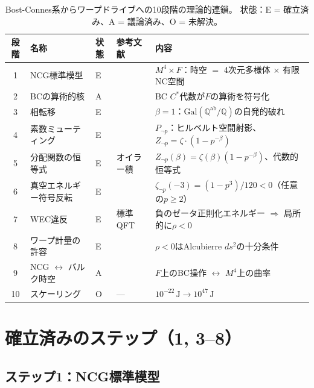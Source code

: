 \documentclass[11pt,a4paper]{article}
\newcommand{\Gal}{\mathrm{Gal}}
\begin{document}
\begin{table}[t]
\centering
\caption{Bost-Connes系からワープドライブへの10段階の理論的連鎖。
状態：E = 確立済み、A = 議論済み、O = 未解決。}
\label{tab:chain}
\begin{tabular}{@{}clllp{5.5cm}@{}}
\toprule
段階 & 名称 & 状態 & 参考文献 & 内容 \\
\midrule
1 & NCG標準模型 & E & \cite{Connes1996,CCM2007} & $M^4 \times F$：時空 $=$ 4次元多様体 $\times$ 有限NC空間 \\
2 & BCの算術的核 & A & \cite{ConnesMarcolli2006} & BC $C^*$代数が$F$の算術を符号化 \\
3 & 相転移 & E & \cite{BostConnes1995} & $\beta = 1$：$\Gal(\mathbb{Q}^{\mathrm{ab}}/\mathbb{Q})$の自発的破れ \\
4 & 素数ミューティング & E & \cite{paper_A} & $P_{\neg p}$：ヒルベルト空間射影、$Z_{\neg p} = \zeta \cdot (1-p^{-\beta})$ \\
5 & 分配関数の恒等式 & E & オイラー積 & $Z_{\neg p}(\beta) = \zeta(\beta)(1-p^{-\beta})$、代数的恒等式 \\
6 & 真空エネルギー符号反転 & E & \cite{paper_A} & $\zeta_{\neg p}(-3) = (1-p^3)/120 < 0$（任意の$p \geq 2$） \\
7 & WEC違反 & E & 標準QFT & 負のゼータ正則化エネルギー $\Rightarrow$ 局所的に$\rho < 0$ \\
8 & ワープ計量の許容 & E & \cite{Alcubierre1994} & $\rho < 0$はAlcubierre $ds^2$の十分条件 \\
9 & NCG $\leftrightarrow$ バルク時空 & A & \cite{ConnesMarcolli2006,Maldacena1998} & $F$上のBC操作 $\leftrightarrow$ $M^4$上の曲率 \\
10 & スケーリング & O & --- & $10^{-22}\,\mathrm{J} \to 10^{47}\,\mathrm{J}$ \\
\bottomrule
\end{tabular}
\end{table}

\section{確立済みのステップ（1, 3--8）}
\label{sec:established}

\subsection{ステップ1：NCG標準模型}
\end{document}

